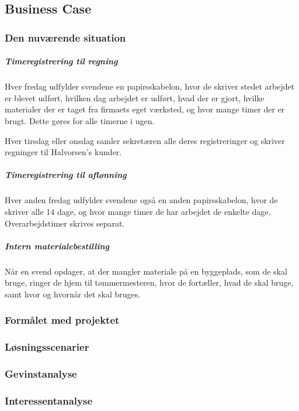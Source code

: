 \subsection{Business Case}
\subsubsection{Den nuværende situation}
\subparagraph{Timeregistrering til regning}

    Hver fredag udfylder svendene en papirsskabelon, hvor de skriver stedet arbejdet er blevet udført, hvilken dag arbejdet er udført, hvad der er gjort, hvilke materialer der er taget fra firmaets eget værksted, og hvor mange timer der er brugt.
    Dette gøres for alle timerne i ugen.
    
    Hver tirsdag eller onsdag samler sekretæren alle deres registreringer og skriver regninger til Halvorsen's kunder.

\subparagraph{Timeregistrering til aflønning}
    Hver anden fredag udfylder svendene også en anden papirsskabelon, hvor de skriver alle 14 dage, og hvor mange timer de har arbejdet de enkelte dage. Overarbejdstimer skrives separat.
    
\subparagraph{Intern materialebestilling}
    Når en svend opdager, at der mangler materiale på en byggeplads, som de skal bruge, ringer de hjem til tømmermesteren, hvor de fortæller, hvad de skal bruge, samt hvor og hvornår det skal bruges.
    
\subsubsection{Formålet med projektet}

\subsubsection{Løsningsscenarier}

\subsubsection{Gevinstanalyse}

\subsubsection{Interessentanalyse}
